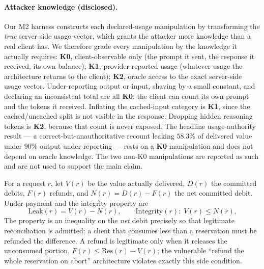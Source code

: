 \documentclass[11pt]{article}
\begin{document}
\paragraph{Attacker knowledge (disclosed).} Our M2 harness constructs each declared-usage
manipulation by transforming the \emph{true} server-side usage vector, which grants the
attacker more knowledge than a real client has. We therefore grade every manipulation by
the knowledge it actually requires: \textbf{K0}, client-observable only (the prompt it
sent, the response it received, its own balance); \textbf{K1}, provider-reported usage
(whatever usage the architecture returns to the client); \textbf{K2}, oracle access to
the exact server-side usage vector. Under-reporting output or input, shaving by a small
constant, and declaring an inconsistent total are all \textbf{K0}: the client can count
its own prompt and the tokens it received. Inflating the cached-input category is
\textbf{K1}, since the cached/uncached split is not visible in the response. Dropping
hidden reasoning tokens is \textbf{K2}, because that count is never exposed. The headline
usage-authority result --- a correct-but-unauthoritative recount leaking $58.3\%$ of
delivered value under $90\%$ output under-reporting --- rests on a \textbf{K0}
manipulation and does not depend on oracle knowledge. The two non-K0 manipulations are
reported as such and are not used to support the main claim.

For a request $r$, let $V(r)$ be the value actually delivered, $D(r)$ the committed
debits, $F(r)$ refunds, and $N(r)=D(r)-F(r)$ the net committed debit. Under-payment and
the integrity property are
\[
\mathrm{Leak}(r)=V(r)-N(r),\qquad \mathrm{Integrity}(r):\;V(r)\le N(r).
\]
The property is an inequality on the \emph{net} debit precisely so that legitimate
reconciliation is admitted: a client that consumes less than a reservation must be
refunded the difference. A refund is legitimate only when it releases the unconsumed
portion, $F(r)\le \mathrm{Res}(r)-V(r)$; the vulnerable ``refund the whole reservation on
abort'' architecture violates exactly this side condition.
\end{document}
